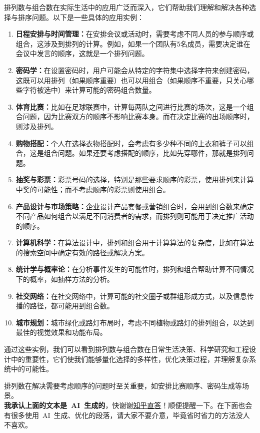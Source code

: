 \documentclass[a5paper]{article}
\begin{document}
排列数与组合数在实际生活中的应用广泛而深入，它们帮助我们理解和解决各种选择与排序问题。以下是一些具体的应用实例：
\begin{enumerate}
    \item \textbf{日程安排与时间管理：}在安排会议或活动时，需要考虑不同人员的参与顺序或组合，这涉及到排列的计算。例如，如果一个团队有5名成员，需要决定谁在会议中发言的顺序，这就是一个排列问题。
    \item \textbf{密码学：}在设置密码时，用户可能会从特定的字符集中选择字符来创建密码，这既可以用排列（如果顺序重要）也可以用组合（如果顺序不重要，只关心哪些字符被选中）来计算可能的密码组合数量。
    \item \textbf{体育比赛：}比如在足球联赛中，计算每两队之间进行比赛的场次，这是一个组合问题，因为比赛双方的顺序不影响比赛本身。而在决定比赛的出场顺序时，则涉及排列。
    \item \textbf{购物搭配：}个人在选择衣物搭配时，会考虑有多少种不同的上衣和裤子可以组合，这是组合问题。如果还要考虑搭配的顺序，比如先穿哪件，那就是排列问题。
    \item \textbf{抽奖与彩票：}彩票号码的选择，特别是那些要求顺序的彩票，使用排列来计算中奖的可能性；而不考虑顺序的彩票则使用组合。
    \item\textbf{ 产品设计与市场策略：}企业设计产品套餐或营销组合时，会用到组合数来确定不同产品如何组合以满足不同消费者的需求，而排列则可能用于决定推广活动的顺序。
    \item \textbf{计算机科学：}在算法设计中，排列和组合用于计算算法的复杂度，比如在算法的搜索空间中确定有效的路径或解决方案。
    \item \textbf{统计学与概率论：}在分析事件发生的可能性时，排列和组合帮助计算不同情况下的概率，如抽样方法的分析。
    \item \textbf{社交网络：}在社交网络中，计算可能的社交圈子或群组形成方式，以及信息传播的路径，都可能用到组合数。
    \item \textbf{城市规划：}城市绿化或路灯布局时，考虑不同植物或路灯的排列组合，以达到最佳的视觉效果和功能布局。
\end{enumerate}
通过这些实例，我们可以看到排列数与组合数在日常生活决策、科学研究和工程设计中的重要性，它们使我们能够量化选择的多样性，优化决策过程，并理解复杂系统中的可能性。

排列数在解决需要考虑顺序的问题时至关重要，如安排比赛顺序、密码生成等场景。\\

\textbf{我承认上面的文本是~AI~生成的}，快谢谢\href{https://zhida.zhihu.com/}{知乎直答}！顺便提醒一下。在下面也会有很多使用~AI~生成、优化的段落，请大家不要介意，毕竟省时省力的方法没人不喜欢。







% 
\end{document}
